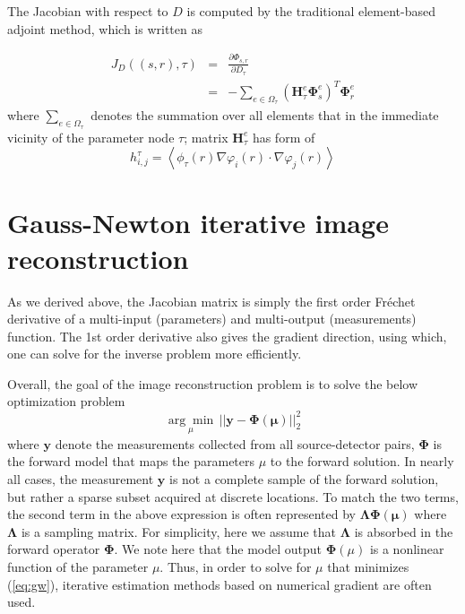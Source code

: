 \documentclass[12pt]{book}               %
\begin{document}
The Jacobian with respect to $D$ is computed by the traditional
element-based adjoint method, which is written as

\begin{eqnarray}\nonumber
J_{D}((s,r),\tau)&=&\frac{\partial
\Phi_{s,r}}{\partial D_{\tau}}\\&=&-\sum_{e\in\Omega_\tau}\left(\mathbf{H}_\tau^e{\boldsymbol\Phi}_s^e\right)^T{\boldsymbol\Phi}_r^e
\end{eqnarray}
where $\sum_{e\in\Omega_\tau}$ denotes the summation over all
elements that in the immediate vicinity of the parameter node $\tau$;
matrix $\mathbf{H}_\tau^e$ has form of
\begin{equation}
h^\tau_{i,j}=\left\langle
\phi_\tau(r)\nabla\varphi_i(r)\cdot\nabla\varphi_j(r)\right\rangle
\end{equation}

\section{Gauss-Newton iterative image reconstruction}
As we derived above, the Jacobian matrix is simply the first order Fr\'echet derivative of a multi-input (parameters) and multi-output (measurements) function. The 1st order derivative also gives the gradient direction, using which, one can solve for the inverse problem more efficiently.

Overall, the goal of the image reconstruction problem is to solve the below optimization problem
\begin{equation}\label{eq:gw}
\underset{\mu}{\arg\min} \, || \mathbf{y-\Phi(\mu)} ||^2_2
\end{equation}
where $\mathbf y$ denote the measurements collected from all source-detector pairs, $\mathbf\Phi$ is the forward model that maps the parameters $\mu$ to the forward solution. In nearly all cases, the measurement $\mathbf y$ is not a complete sample of the forward solution, but rather a sparse subset acquired at discrete locations. To match the two terms, the second term in the above expression is often represented by $\mathbf{\Lambda\Phi(\mu)}$ where $\mathbf\Lambda$ is a sampling matrix. For simplicity, here we assume that $\mathbf\Lambda$ is absorbed in the forward operator $\mathbf\Phi$. We note here that the model output $\mathbf\Phi(\mu)$ is a nonlinear function of the parameter $\mu$. Thus, in order to solve for $\mu$ that minimizes (\ref{eq:gw}), iterative estimation methods based on numerical gradient are often used.
\end{document}
